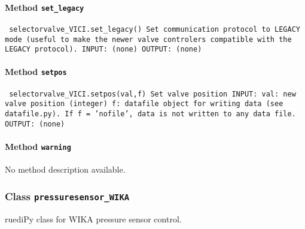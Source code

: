 \paragraph{Method \texttt{set_legacy}}
\vspace{1ex}
\texttt{\newline
selectorvalve_VICI.set_legacy()\newline
\newline
Set communication protocol to LEGACY mode (useful to make the newer valve controlers compatible with the LEGACY protocol).\newline
\newline
INPUT:\newline
(none)\newline
\newline
OUTPUT:\newline
(none)\newline
\newline
}

\paragraph{Method \texttt{setpos}}
\vspace{1ex}
\texttt{\newline
selectorvalve_VICI.setpos(val,f)\newline
\newline
Set valve position\newline
\newline
INPUT:\newline
val: new valve position (integer)\newline
f: datafile object for writing data (see datafile.py). If f = 'nofile', data is not written to any data file.\newline
\newline
OUTPUT:\newline
(none)\newline
\newline
}

\paragraph{Method \texttt{warning}}
\vspace{1ex}
No method description available.\par

\subsubsection{Class \texttt{pressuresensor_WIKA}}
\par
ruediPy class for WIKA pressure sensor control.\par


